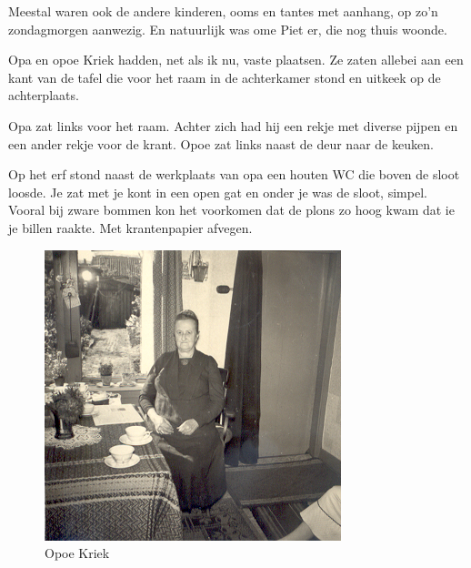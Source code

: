 \documentclass[12pt,twoside, openright]{memoir}
\begin{document}
Meestal waren ook de andere kinderen, ooms en tantes met aanhang, op zo’n zondagmorgen aanwezig. En natuurlijk was ome Piet er, die nog thuis woonde. 

Opa en opoe Kriek hadden, net als ik nu, vaste plaatsen. Ze zaten allebei aan een kant van de tafel die voor het raam in de achterkamer stond en uitkeek op de achterplaats. 

Opa zat links voor het raam. Achter zich had hij een rekje met diverse pijpen en een ander rekje voor de krant. Opoe zat links naast de deur naar de keuken.

Op het erf stond naast de werkplaats van opa een houten WC die boven de sloot loosde. Je zat met je kont in een open gat en onder je was de sloot, simpel. Vooral bij zware bommen kon het voorkomen dat de plons zo hoog kwam dat ie je billen raakte. Met krantenpapier afvegen.

\begin{figure}
\includegraphics[width=\textwidth]{img/ch3/opoekriek}
\caption*{\footnotesize Opoe Kriek}
\end{figure}
\end{document}
